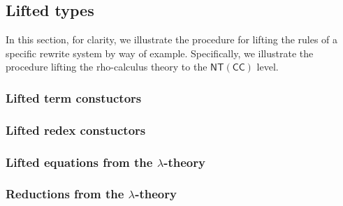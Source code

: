\subsection{Lifted types}

In this section, for clarity, we illustrate the procedure for lifting
the rules of a specific rewrite system by way of
example. Specifically, we illustrate the procedure lifting the
rho-calculus theory to the $\mathsf{NT}(\mathsf{CC})$ level.

\subsubsection{Lifted term constuctors}

\subsubsection{Lifted redex constuctors}

\subsubsection{Lifted equations from the $\lambda$-theory}

\subsubsection{Reductions from the $\lambda$-theory}
